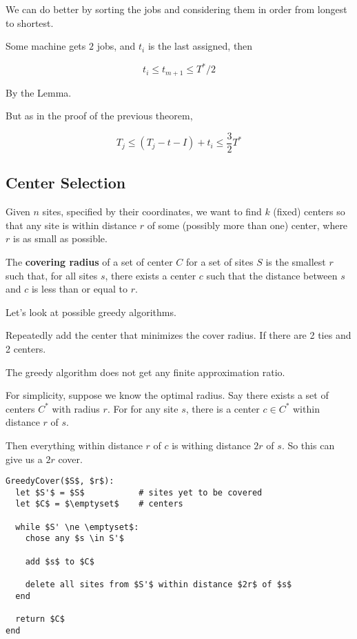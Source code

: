 \documentclass[12pt]{article}
\begin{document}
  We can do better by sorting the jobs and considering them in order from
  longest to shortest.

  {
    Some machine gets $2$ jobs, and $t_i$ is the last assigned, then %

    \[
      t_i \le t_{m + 1} \le T^* / 2
    \]

    By the Lemma.

    But as in the proof of the previous theorem,

    \[
      T_j \le (T_j - t-I) + t_i \le \frac{3}{2} T^*
    \]
  }

  \subsection{Center Selection}

  Given $n$ sites, specified by their coordinates, we want to find $k$ (fixed)
  centers so that any site is within distance $r$ of some (possibly more than
  one) center, where $r$ is as small as possible.

  {
    The {\bf covering radius} of a set of center $C$ for a set of sites $S$ is
    the smallest $r$ such that, for all sites $s$, there exists a center $c$
    such that the distance between $s$ and $c$ is less than or equal to $r$.
  }

  Let's look at possible greedy algorithms.

  Repeatedly add the center that minimizes the cover radius. If there are 2 ties
  and 2 centers.

  The greedy algorithm does not get any finite approximation ratio.

  For simplicity, suppose we know the optimal radius. Say there exists a set
  of centers $C^*$ with radius $r$. For for any site $s$, there is a center $c
  \in C^*$ within distance $r$ of $s$.

  Then everything within distance $r$ of $c$ is withing distance $2r$ of $s$. So
  this can give us a $2r$ cover.

  \begin{lstlisting}[]
GreedyCover($S$, $r$):
  let $S'$ = $S$           # sites yet to be covered
  let $C$ = $\emptyset$    # centers

  while $S' \ne \emptyset$:
    chose any $s \in S'$

    add $s$ to $C$

    delete all sites from $S'$ within distance $2r$ of $s$
  end

  return $C$
end
  \end{lstlisting}
\end{document}
